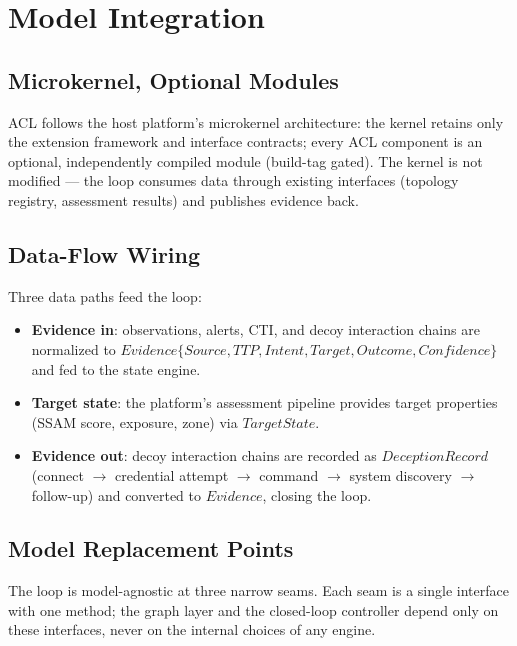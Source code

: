 \documentclass[11pt]{article}
\begin{document}
\section{Model Integration}
\label{sec:integration}

\subsection{Microkernel, Optional Modules}
\label{sec:microkernel}

ACL follows the host platform's microkernel architecture: the kernel retains
only the extension framework and interface contracts; every ACL component is
an optional, independently compiled module (build-tag gated). The kernel is
not modified --- the loop consumes data through existing interfaces
(topology registry, assessment results) and publishes evidence back.

\subsection{Data-Flow Wiring}

Three data paths feed the loop:
\begin{itemize}
\item \textbf{Evidence in}: observations, alerts, CTI, and decoy interaction
      chains are normalized to
      $\mathit{Evidence}\{\mathit{Source},\mathit{TTP},\mathit{Intent},
      \mathit{Target},\mathit{Outcome},\mathit{Confidence}\}$ and fed to the
      state engine.
\item \textbf{Target state}: the platform's assessment pipeline provides
      target properties (SSAM score, exposure, zone) via
      $\mathit{TargetState}$.
\item \textbf{Evidence out}: decoy interaction chains are recorded as
      $\mathit{DeceptionRecord}$ (connect $\to$ credential attempt $\to$
      command $\to$ system discovery $\to$ follow-up) and converted to
      $\mathit{Evidence}$, closing the loop.
\end{itemize}

\subsection{Model Replacement Points}
\label{sec:replacement}

The loop is model-agnostic at three narrow seams. Each seam is a single
interface with one method; the graph layer and the closed-loop controller
depend only on these interfaces, never on the internal choices of any
engine.
\end{document}
